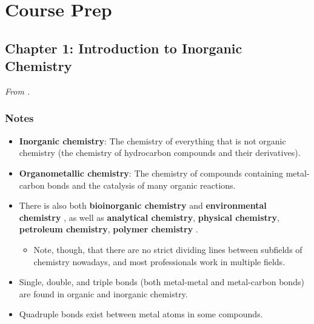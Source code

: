 \documentclass[../main.tex]{subfiles}
\begin{document}
\chapter{Course Prep}
\section{Chapter 1: Introduction to Inorganic Chemistry}
\emph{From \textcite{bib:MiesslerFischerTarr}.}
\subsection{Notes}
\begin{itemize}
    \item {}\textbf{Inorganic chemistry}: The chemistry of everything that is not organic chemistry (the chemistry of hydrocarbon compounds and their derivatives).
    \item \textbf{Organometallic chemistry}: The chemistry of compounds containing metal-carbon bonds and the catalysis of many organic reactions.
    \item There is also both \textbf{bioinorganic chemistry} and \textbf{environmental chemistry} \parencite[1]{bib:MiesslerFischerTarr}, as well as \textbf{analytical chemistry}, \textbf{physical chemistry}, \textbf{petroleum chemistry}, \textbf{polymer chemistry} \parencite[4]{bib:MiesslerFischerTarr}.
    \begin{itemize}
        \item Note, though, that there are no strict dividing lines between subfields of chemistry nowadays, and most professionals work in multiple fields.
    \end{itemize}
    \item Single, double, and triple bonds (both metal-metal and metal-carbon bonds) are found in organic and inorganic chemistry.
    \item Quadruple bonds exist between metal atoms in some compounds.
    \begin{figure}[h!]
        \centering
        \begin{subfigure}[b]{0.3\linewidth}
            \centering
\end{subfigure}
\end{figure}
\end{itemize}
\end{document}
